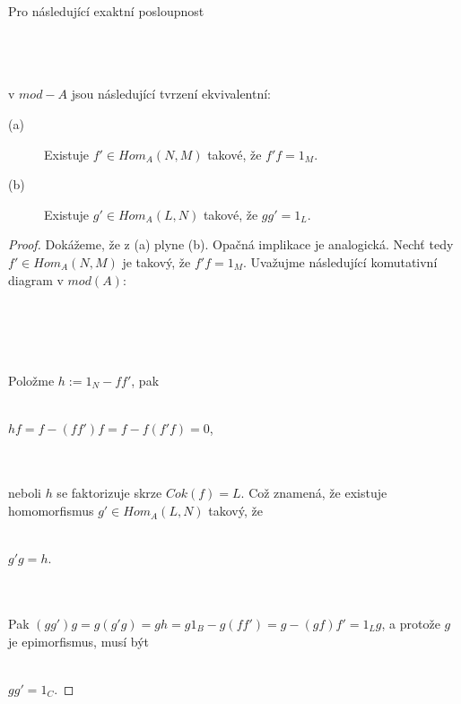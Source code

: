      \begin{lem}\label{lem-almost-split-def}
       Pro následující exaktní posloupnost\\\\
       \centerline{}\\\\ 
       v $mod-A$ jsou následující tvrzení ekvivalentní:
       \begin{description}
         \item[(a)] Existuje $f'\in Hom_A(N,M)$ takové, že $f'f=1_M$.
         \item[(b)] Existuje $g'\in Hom_A(L,N)$ takové, že $gg'=1_L$.  
       \end{description}        
     \end{lem}
     \begin{proof}
       Dokážeme, že z (a) plyne (b). Opačná implikace je analogická. Nechť tedy $f'\in Hom_A(N,M)$ 
       je takový, že $f'f=1_M$. Uvažujme následující komutativní diagram v 
       $mod(A)$:\\\\
       \centerline{}\\\\\\
       Položme $h:=1_N-ff'$, pak \\\\
       \centerline{$hf=f-(ff')f=f-f(f'f)=0$,} \\\\
       neboli $h$ se faktorizuje skrze $Cok(f)=L$. Což znamená, že existuje homomorfismus $g'\in Hom_A(L,N)$ 
       takový, že \\\\
       \centerline{$g'g=h$.} \\\\
       Pak $(gg')g=g(g'g)=gh=g1_B-g(ff')=g-(gf)f'=1_Lg$, a protože $g$ je 
       epimorfismus, musí být \\\\
       \centerline{$gg'=1_C$.}
     \end{proof}
     
